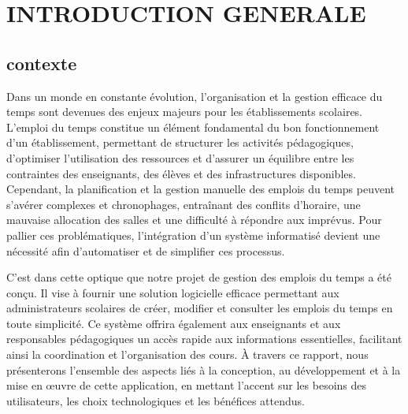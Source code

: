\documentclass[english,12pt,a4paper]{report}
\begin{document}


\chapter*{INTRODUCTION GENERALE}
\vspace{0.8cm}

\section{contexte}
Dans un monde en constante évolution, l'organisation et la gestion efficace du temps sont devenues des enjeux majeurs pour les établissements scolaires. L'emploi du temps constitue un élément fondamental du bon fonctionnement d'un établissement, permettant de structurer les activités pédagogiques, d'optimiser l'utilisation des ressources et d'assurer un équilibre entre les contraintes des enseignants, des élèves et des infrastructures disponibles. Cependant, la planification et la gestion manuelle des emplois du temps peuvent s'avérer complexes et chronophages, entraînant des conflits d'horaire, une mauvaise allocation des salles et une difficulté à répondre aux imprévus. Pour pallier ces problématiques, l'intégration d'un système informatisé devient une nécessité afin d'automatiser et de simplifier ces processus.

C’est dans cette optique que notre projet de gestion des emplois du temps a été conçu. Il vise à fournir une solution logicielle efficace permettant aux administrateurs scolaires de créer, modifier et consulter les emplois du temps en toute simplicité. Ce système offrira également aux enseignants et aux responsables pédagogiques un accès rapide aux informations essentielles, facilitant ainsi la coordination et l’organisation des cours. À travers ce rapport, nous présenterons l’ensemble des aspects liés à la conception, au développement et à la mise en œuvre de cette application, en mettant l’accent sur les besoins des utilisateurs, les choix technologiques et les bénéfices attendus.
\end{document}
